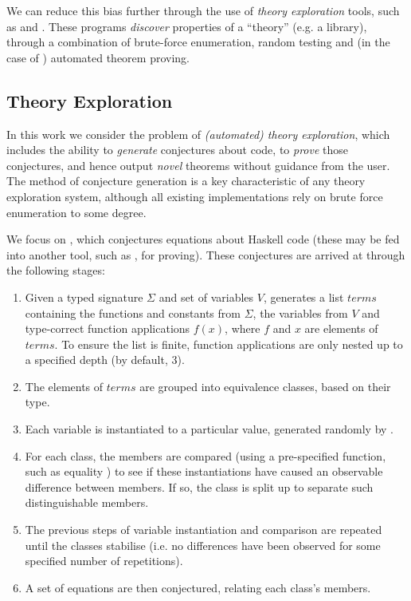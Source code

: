 We can reduce this bias further through the use of \emph{theory exploration} tools, such as \qspec{} and \hspec{}. These programs \emph{discover} properties of a ``theory'' (e.g. a library), through a combination of brute-force enumeration, random testing and (in the case of \hspec{}) automated theorem proving.

\subsection{Theory Exploration}
\label{sec:theoryexploration}

In this work we consider the problem of \emph{(automated) theory exploration}, which includes the ability to \emph{generate} conjectures about code, to \emph{prove} those conjectures, and hence output \emph{novel} theorems without guidance from the user. The method of conjecture generation is a key characteristic of any theory exploration system, although all existing implementations rely on brute force enumeration to some degree.

We focus on \qspec{} \citep{QuickSpec}, which conjectures equations about Haskell code (these may be fed into another tool, such as \hspec{}, for proving). These conjectures are arrived at through the following stages:

\begin{enumerate}
  \item Given a typed signature $\Sigma$ and set of variables $V$, \qspec{} generates a list $terms$ containing the functions and constants from $\Sigma$, the variables from $V$ and type-correct function applications $f(x)$, where $f$ and $x$ are elements of $terms$. To ensure the list is finite, function applications are only nested up to a specified depth (by default, 3).
  \item The elements of $terms$ are grouped into equivalence classes, based on their type.
  \item Each variable is instantiated to a particular value, generated randomly by \qcheck{}.
  \item For each class, the members are compared (using a pre-specified function, such as equality \hs{==}) to see if these instantiations have caused an observable difference between members. If so, the class is split up to separate such distinguishable members.
  \item The previous steps of variable instantiation and comparison are repeated until the classes stabilise (i.e. no differences have been observed for some specified number of repetitions).
  \item A set of equations are then conjectured, relating each class's members.
\end{enumerate}

